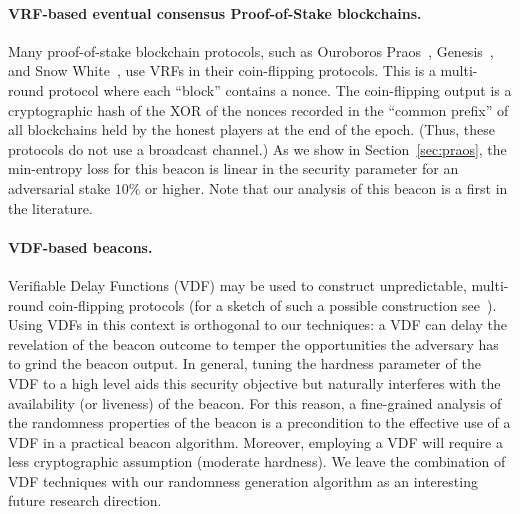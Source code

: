 \paragraph{VRF-based eventual consensus Proof-of-Stake blockchains.}
Many proof-of-stake blockchain
protocols, such as Ouroboros Praos~\cite{Praos}, 
Genesis~\cite{Genesis}, and Snow White~\cite {SnowWhite}, 
use VRFs 
in their coin-flipping protocols. 
This is a multi-round protocol 
where each ``block'' contains a nonce.  
The coin-flipping output is a cryptographic hash 
of the XOR of the nonces 
recorded in the ``common prefix'' of all 
blockchains held by the honest players 
at the end of the epoch. 
(Thus, these protocols do not use a broadcast channel.)
As we show in Section~\ref{sec:praos}, 
the min-entropy loss for this beacon 
is linear in the security parameter 
for an adversarial stake $10\%$ or higher.
Note that our analysis of this beacon 
is a first in the literature. 


\paragraph{VDF-based beacons.} 
Verifiable Delay Functions (VDF)
\cite{vdf-boneh,vdf-wesolowski,vdf-pietrzak} may be used to construct
unpredictable, multi-round coin-flipping protocols (for a sketch of
such a possible construction see~\cite{vdf-ethereum}). Using VDFs in
this context is orthogonal to our techniques: a VDF can delay the
revelation of the beacon outcome to temper the opportunities the
adversary has to grind the beacon output. In general, tuning the
hardness parameter of the VDF to a high level aids this security
objective but naturally interferes with the availability (or liveness)
of the beacon.
For this reason, a fine-grained analysis of the
randomness properties of the beacon is a precondition to the effective
use of a VDF in a practical beacon algorithm. Moreover, employing a
VDF will require a less cryptographic assumption (moderate hardness).
We leave the combination of VDF techniques with our randomness
generation algorithm as an interesting future research direction.

